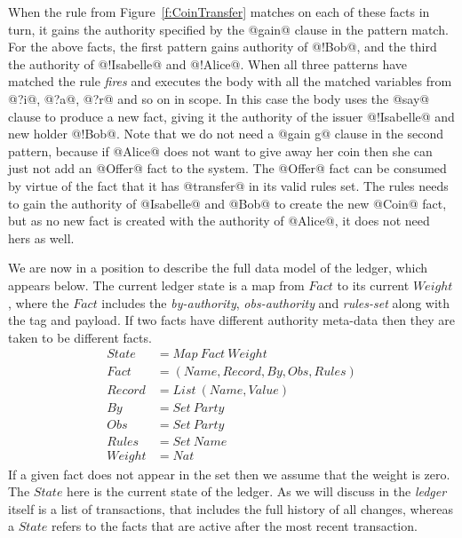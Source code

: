 When the rule from Figure~\ref{f:CoinTransfer} matches on each of these facts in turn, it gains the authority specified by the @gain@ clause in the pattern match. For the above facts, the first pattern gains authority of @!Bob@, and the third the authority of @!Isabelle@ and @!Alice@. When all three patterns have matched the rule \emph{fires} and executes the body with all the matched variables from @?i@, @?a@, @?r@ and so on in scope. In this case the body uses the @say@ clause to produce a new fact, giving it the authority of the issuer @!Isabelle@ and new holder @!Bob@. Note that we do not need a @gain g@ clause in the second pattern, because if @Alice@ does not want to give away her coin then she can just not add an @Offer@ fact to the system. The @Offer@ fact can be consumed by virtue of the fact that it has @transfer@ in its valid rules set. The rules needs to gain the authority of @Isabelle@ and @Bob@ to create the new @Coin@ fact, but as no new fact is created with the authority of @Alice@, it does not need hers as well.

We are now in a position to describe the full data model of the ledger, which appears below. The current ledger state is a map from $Fact$ to its current $Weight$, where the $Fact$ includes the \emph{by-authority}, \emph{obs-authority} and \emph{rules-set} along with the tag and payload. If two facts have different authority meta-data then they are taken to be different facts.
$$
\begin{array}{ll}
   State   & = Map~ Fact~ Weight
\\ Fact    & = (Name, Record, By, Obs, Rules)
\\ Record  & = List~ (Name, Value)
\\ By      & = Set~ Party
\\ Obs     & = Set~ Party
\\ Rules   & = Set~ Name
\\ Weight  & = Nat
\end{array}
$$
If a given fact does not appear in the set then we assume that the weight is zero. The $State$ here is the current state of the ledger. As we will discuss in \REF the \emph{ledger} itself is a list of transactions, that includes the full history of all changes, whereas a $State$ refers to the facts that are active after the most recent transaction.



